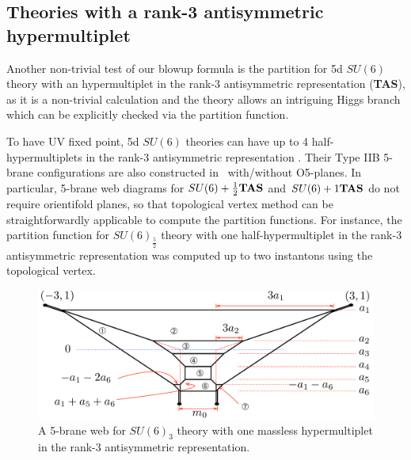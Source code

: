 \subsection{Theories with a rank-3 antisymmetric hypermultiplet}\label{}
\label{subsec:rank3}
Another non-trivial test of our blowup formula is the partition for 5d $SU(6)$ theory with an hypermultiplet in the rank-3 antisymmetric representation ({\bf TAS}), 
as it is a non-trivial calculation and the theory allows an intriguing Higgs branch which can be explicitly checked via the partition function.

To have UV fixed point, 5d $SU(6)$ theories can have up to 4 half-hypermultiplets in the rank-3 antisymmetric representation \cite{Jefferson:2017ahm}. Their Type IIB 5-brane configurations are also constructed in~\cite{Hayashi:2019yxj} with/without O5-planes. In particular, 5-brane web diagrams for $SU(6)+\frac12{\bf TAS}$ and $SU(6)+1{\bf TAS}$ do not require orientifold planes, so that topological vertex method \cite{Aganagic:2003db, Iqbal:2007ii} can be straightforwardly applicable to compute the partition functions. For instance, the partition function for $SU(6)_\frac52$ theory with one half-hypermultiplet in the rank-3 antisymmetric representation was computed up to two instantons \cite{Hayashi:2019yxj} using the topological vertex.
\begin{figure}[t]
\centering
\includegraphics[width=12cm]{SU6-monopole.pdf}
\caption{A 5-brane web for $SU(6)_3$ theory with one massless hypermultiplet in the rank-3 antisymmetric representation.}
\label{fig:SU6-monopole}
\end{figure}

